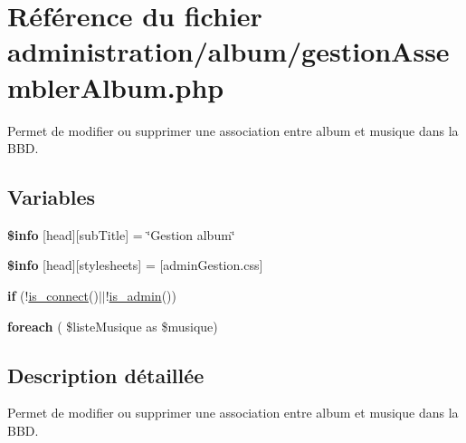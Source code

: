\hypertarget{gestionAssemblerAlbum_8php}{}\section{Référence du fichier administration/album/gestion\+Assembler\+Album.php}
\label{gestionAssemblerAlbum_8php}


Permet de modifier ou supprimer une association entre album et musique dans la B\+BD.  


\subsection*{Variables}
\begin{DoxyCompactItemize}
\item 
\mbox{\label{gestionAssemblerAlbum_8php_a024f87f9bf4f3b33710e2e7ff8f60823}} 
{\bfseries \$info} \mbox{[}\textquotesingle{}head\textquotesingle{}\mbox{]}\mbox{[}\textquotesingle{}sub\+Title\textquotesingle{}\mbox{]} = \char`\"{}Gestion album\char`\"{}
\item 
\mbox{\label{gestionAssemblerAlbum_8php_af6044c8bf78ebc8c58057e14d7738bbd}} 
{\bfseries \$info} \mbox{[}\textquotesingle{}head\textquotesingle{}\mbox{]}\mbox{[}\textquotesingle{}stylesheets\textquotesingle{}\mbox{]} = \mbox{[}\textquotesingle{}admin\+Gestion.\+css\textquotesingle{}\mbox{]}
\item 
\mbox{\label{gestionAssemblerAlbum_8php_afa4cacb4c71b05c2874f2b16e0f46227}} 
{\bfseries if} (!\hyperlink{fonctionCompte_8php_a2fe594e0482307b8729ea37780d6f74b}{is\+\_\+connect}()$\vert$$\vert$!\hyperlink{fonctionCompte_8php_a0b327581800dba50ad70720e23ae2ed2}{is\+\_\+admin}())
\item 
\mbox{\label{gestionAssemblerAlbum_8php_adf9bf5726cbdab4744679c2eb34b7ec0}} 
{\bfseries foreach} ( \$liste\+Musique as \$musique)
\end{DoxyCompactItemize}


\subsection{Description détaillée}
Permet de modifier ou supprimer une association entre album et musique dans la B\+BD. 

